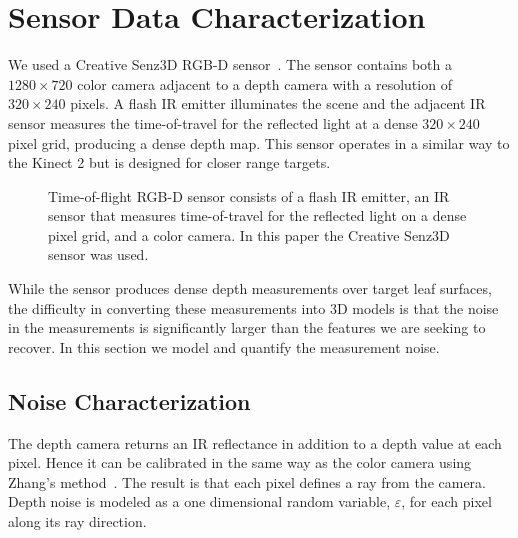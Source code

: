 \section{Sensor Data Characterization}
\label{sec:data}


We used a Creative Senz3D RGB-D sensor~\cite{nguyen2015vietnamese}. The sensor contains both a $1280 \times 720$ color camera adjacent to a depth camera with a resolution of $320\times240$ pixels.  A flash IR emitter illuminates the scene and the adjacent IR sensor measures the time-of-travel for the reflected light at a dense $320 \times 240$ pixel grid, producing a dense depth map.  This sensor operates in a similar way to the Kinect 2 but is designed for closer range targets.  

\begin{figure}
\begin{center}
\fbox{\rule{0pt}{2in} \rule{.9\linewidth}{0pt}}
\end{center}
   \caption{Time-of-flight RGB-D sensor consists of a flash IR emitter, an IR sensor that measures time-of-travel for the reflected light on a dense pixel grid, and a color camera.  In this paper the Creative Senz3D sensor was used.}
\label{fig:sensor}
\end{figure}

While the sensor produces dense depth measurements over target leaf surfaces, the difficulty in converting these measurements into 3D models is that the noise in the measurements is significantly larger than the features we are seeking to recover.  In this section we model and quantify the measurement noise.

\subsection{Noise Characterization}
\label{sec:noise}

The depth camera returns an IR reflectance in addition to a depth value at each pixel.  Hence it can be calibrated in the same way as the color camera using Zhang's method~\cite{Zhang2000}.  The result is that each pixel defines a ray from the camera.  Depth noise is modeled as a one dimensional random variable, $\varepsilon$, for each pixel along its ray direction.

